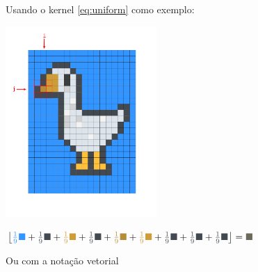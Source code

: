 \documentclass[a4paper, 11pt]{article}
\begin{document}
Usando o kernel \ref{eq:uniform} como exemplo:


\begin{center}
    \begin{minipage}{0.37\textwidth}
        \includegraphics[height=7.25cm]{figures/goose.pdf}
    \end{minipage}
    \begin{minipage}{0.55\textwidth}
        $
        \left\lfloor
        \textcolor{azulfundo}{\frac{1}{9} \blacksquare} +
        \textcolor{cinzaborda}{\frac{1}{9} \blacksquare} +
        \textcolor{bicodois}{\frac{1}{9} \blacksquare} +
        \textcolor{cinzaborda}{\frac{1}{9} \blacksquare} + 
        \textcolor{bicoum}{\frac{1}{9} \blacksquare} + 
        \textcolor{bicodois}{\frac{1}{9} \blacksquare} +
        \textcolor{cinzaborda}{\frac{1}{9} \blacksquare} + 
        \textcolor{cinzaborda}{\frac{1}{9} \blacksquare} + 
        \textcolor{cinzaborda}{\frac{1}{9} \blacksquare}
        \right\rfloor  = \textcolor{novo}{\blacksquare}
        $
    \end{minipage}
\end{center}

Ou com a notação vetorial
\end{document}
